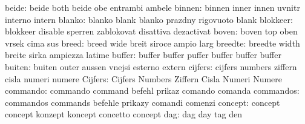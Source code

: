                     beide: beide                     both
                           beide                     obe
                           entrambi                  ambele
                   binnen: binnen                    inner
                           innen                     uvnitr
                           interno                   intern
                   blanko: blanko                    blank
                           blanko                    prazdny
                           rigovuoto                 blank
                 blokkeer: blokkeer                  disable
                           sperren                   zablokovat
                           disattiva                 dezactivat
                    boven: boven                     top
                           oben                      vrsek
                           cima                      sus
                    breed: breed                     wide
                           breit                     siroce
                           ampio                     larg
                  breedte: breedte                   width
                           breite                    sirka
                           ampiezza                  latime
                   buffer: buffer                    buffer
                           puffer                    buffer
                           buffer                    buffer
                   buiten: buiten                    outer
                           aussen                    vnejsi
                           esterno                   extern
                  cijfers: cijfers                   numbers
                           ziffern                   cisla
                           numeri                    numere
                  Cijfers: Cijfers                   Numbers
                           Ziffern                   Cisla
                           Numeri                    Numere
                 commando: commando                  command
                           befehl                    prikaz
                           comando                   comanda
                commandos: commandos                 commands
                           befehle                   prikazy
                           comandi                   comenzi
                  concept: concept                   concept
                           konzept                   koncept
                           concetto                  concept
                      dag: dag                       day
                           tag                       den
